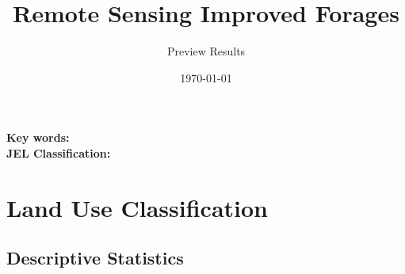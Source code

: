 \documentclass[10pt,a4paper,onecolumn]{article}
\title{Remote Sensing Improved Forages}
\author{Preview Results}
\date{\today}
\begin{document}
\maketitle

\thispagestyle{empty} %





\begin{abstract}
\noindent \end{abstract}




\medskip

\begin{flushleft}
  {\bf Key words: }         \\
  {\bf JEL Classification: }
\end{flushleft}

\pagebreak
\doublespacing



 \pagebreak
 \setcounter{page}{1} 
 \setcounter{footnote}{0} 
 \setcounter{section}{0}
\setcounter{figure}{0}
\setcounter{table}{0}
\setcounter{equation}{0}
\makeatletter 
\renewcommand{\thefigure}{\@arabic\c@figure}
\renewcommand{\thetable}{\@arabic\c@table}
\renewcommand{\thefootnote}{\arabic{footnote}}
 \renewcommand{\theequation}{\arabic{equation}}


\pagebreak  
\tableofcontents

\pagebreak
\listoffigures
\pagebreak
\listoftables



\pagebreak
\section{Land Use Classification}

\subsection{Descriptive Statistics}
\end{document}
